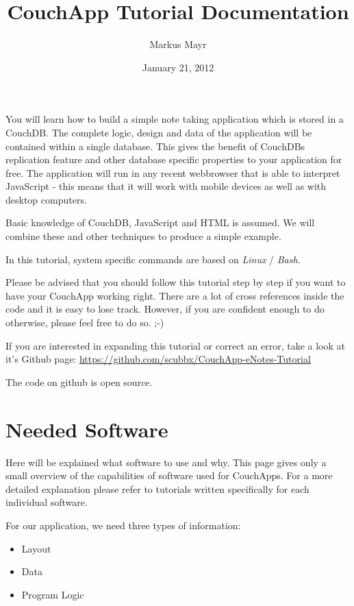 \documentclass[letterpaper,10pt,english]{sphinxmanual}
\title{CouchApp Tutorial Documentation}
\date{January 21, 2012}
\author{Markus Mayr}
\begin{document}
\maketitle
\tableofcontents
{}\label{index::doc}


You will learn how to build a simple note taking application which is stored in a CouchDB. The complete logic, design and data of the application will be contained within a single database. This gives the benefit of CouchDBs replication feature and other database specific properties to your application for free.
The application will run in any recent webbrowser that is able to interpret JavaScript - this means that it will work with mobile devices as well as with desktop computers.

Basic knowledge of CouchDB, JavaScript and HTML is assumed. We will combine these and other techniques to produce a simple example.

In this tutorial, system specific commands are based on \emph{Linux} / \emph{Bash}.

Please be advised that you should follow this tutorial step by step if you want to have your CouchApp working right. There are a lot of cross references inside the code and it is easy to lose track. However, if you are confident enough to do otherwise, please feel free to do so. ;-)

If you are interested in expanding this tutorial or correct an error, take a look at it's Github page: \href{https://github.com/scubbx/CouchApp-eNotes-Tutorial}{https://github.com/scubbx/CouchApp-eNotes-Tutorial}

The code on github is open source.


\chapter{Needed Software}
\label{1-UsedSoftware:needed-software}\label{1-UsedSoftware::doc}\label{1-UsedSoftware:welcome-to-the-couchapp-tutorial}
Here will be explained what software to use and why. This page gives only a small overview of the capabilities of software used for CouchApps. For a more detailed explanation please refer to tutorials written specifically for each individual software.

For our application, we need three types of information:
\begin{itemize}
\item {} 
Layout

\item {} 
Data

\item {} 
Program Logic

\end{itemize}
\end{document}
